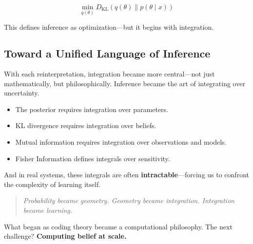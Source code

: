 \[
\min_{q(\theta)} D_{\mathrm{KL}}(q(\theta) \parallel p(\theta \mid x))
\]

This defines inference as optimization—but it begins with integration.




\subsection{Toward a Unified Language of Inference}

With each reinterpretation, integration became more central—not just mathematically, but philosophically. Inference became the art of integrating over uncertainty.

\begin{itemize}
  \item The posterior requires integration over parameters.
  \item KL divergence requires integration over beliefs.
  \item Mutual information requires integration over observations and models.
  \item Fisher Information defines integrals over sensitivity.
\end{itemize}

And in real systems, these integrals are often \textbf{intractable}—forcing us to confront the complexity of learning itself.

\begin{quote}
\emph{Probability became geometry. Geometry became integration. Integration became learning.}
\end{quote}

What began as coding theory became a computational philosophy.  
The next challenge? \textbf{Computing belief at scale.}